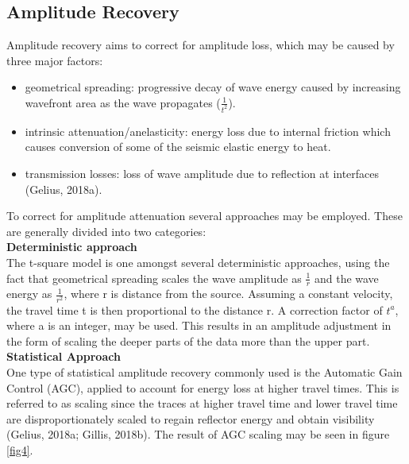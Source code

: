 \documentclass[10pt,a4paper]{article}
\begin{document}
\subsection{Amplitude Recovery}

Amplitude recovery aims to correct for amplitude loss, which may be caused by three major factors:

\begin{itemize}
    \item geometrical spreading: progressive decay of wave energy caused by increasing wavefront area as the wave propagates ($\frac{1}{t^2}$).
    \item intrinsic attenuation/anelasticity: energy loss due to internal friction which causes conversion of some of the seismic elastic energy to heat.
    \item transmission losses: loss of wave amplitude due to reflection at interfaces (Gelius, 2018a).
\end{itemize}

\noindent To correct for amplitude attenuation several approaches may be employed. These are generally divided into two categories:
\\
{\bf Deterministic approach}
\\
The t-square model is one amongst several deterministic approaches, using the fact that geometrical spreading scales the wave amplitude as $\frac{1}{r}$ and the wave energy as $\frac{1}{r^2}$, where r is distance from the source. Assuming a constant velocity, the travel time t is then proportional to the distance r. A correction factor of $t^a$, where a is an integer, may be used. This results in an amplitude adjustment in the form of scaling the deeper parts of the data more than the upper part.
\\
{\bf Statistical Approach}
\\
One type of statistical amplitude recovery commonly used is the Automatic Gain Control (AGC), applied to account for energy loss at higher travel times. This is referred to as scaling since the traces at higher travel time and lower travel time are disproportionately scaled to regain reflector energy and obtain visibility (Gelius, 2018a; Gillis, 2018b). The result of AGC scaling may be seen in figure \ref{fig4}.
\end{document}
